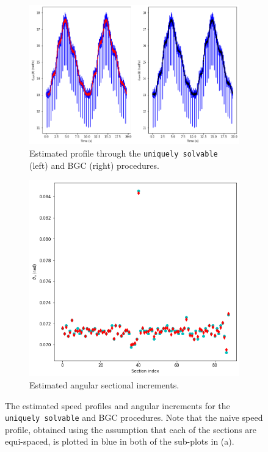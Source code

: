 \documentclass{article}
\begin{document}
	\begin{figure}[htb!]
		\centering
		\begin{subfigure}[b]{0.7\textwidth}
			\centering
			\includegraphics[width=\textwidth]{Q4_3.png}
			\caption{Estimated profile through the \texttt{uniquely solvable} (left) and BGC (right) procedures.}
		\end{subfigure}
		
		\begin{subfigure}[b]{0.45\textwidth}
			\centering
			\includegraphics[width=\textwidth]{Q4_4.png}
			\caption{Estimated angular sectional increments.}
		\end{subfigure}
		
		\caption{The estimated speed profiles and angular increments for the \texttt{uniquely solvable} and BGC procedures. Note that the naive speed profile, obtained using the assumption that each of the sections are equi-spaced, is plotted in blue in both of the sub-plots in (a).}
		\label{fig:Q4_actual_signal_comparison}
	\end{figure}
	
\end{document}
